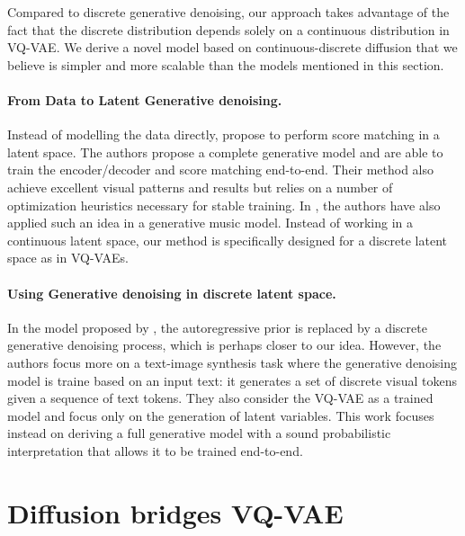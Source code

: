 \documentclass{article}
\theoremstyle{plain}
\theoremstyle{definition}
\theoremstyle{remark}
\begin{document}
Compared to discrete generative denoising, our approach takes advantage of the fact that the discrete distribution depends solely on a continuous distribution in VQ-VAE. We derive a novel model based on continuous-discrete diffusion that we believe is simpler and more scalable than the models mentioned in this section.

\paragraph{From Data to Latent Generative denoising.}
Instead of modelling the data directly, \cite{vahdat2021score} propose to perform score matching in a latent space. The authors propose a complete generative model and are able to train the encoder/decoder and score matching end-to-end. Their method also achieve excellent visual patterns and results but relies on a number of optimization heuristics necessary for stable training. In \cite{mittal2021symbolic}, the authors  have also applied such an idea in a generative music model. Instead of working in a continuous latent space, our method is specifically designed for a discrete latent space as in VQ-VAEs.


\paragraph{Using Generative denoising in discrete latent space. }
In the model proposed by \cite{gu2021vector}, the autoregressive prior is replaced by a discrete generative denoising process, which is perhaps closer to our idea. However, the authors focus more on a text-image synthesis task where the generative denoising model is traine based on an input text: it generates a set of discrete visual tokens given a sequence of text tokens. They also consider the VQ-VAE as a trained model and focus only on the generation of latent variables. This work focuses instead on deriving a full generative model with a sound probabilistic interpretation that allows it to be trained end-to-end.

\section{Diffusion bridges VQ-VAE}
\end{document}
